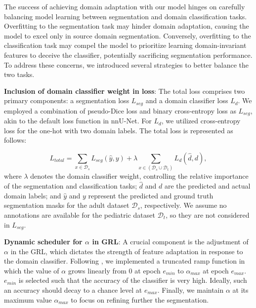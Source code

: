 \documentclass[runningheads]{llncs}
\begin{document}
The success of achieving domain adaptation with our model hinges on carefully balancing model learning between segmentation and domain classification tasks. Overfitting to the segmentation task may hinder domain adaptation, causing the model to excel only in source domain segmentation. Conversely, overfitting to the classification task may compel the model to prioritize learning domain-invariant features to deceive the classifier, potentially sacrificing segmentation performance. To address these concerns, we introduced several strategies to better balance the two tasks.

\textbf{Inclusion of domain classifier weight in loss}: The total loss comprises two primary components: a segmentation loss $L_{seg}$ and a domain classifier loss $L_d$. We employed a combination of pseudo-Dice loss and binary cross-entropy loss as $L_{seg}$, akin to the default loss function in nnU-Net. For $L_d$, we utilized cross-entropy loss for the one-hot with two domain labels. The total loss is represented as follows:

\begin{equation}
    L_{total} = \sum_{x\in \mathcal{D}_s} L_{seg}(\hat{y}, y) + \lambda \sum_{x\in (\mathcal{D}_s \cup \mathcal{D}_t)} L_{d}(\hat{d}, d),
\end{equation}
where $\lambda$ denotes the domain classifier weight, controlling the relative importance of the segmentation and classification tasks; $\hat{d}$ and $d$ are the predicted and actual domain labels; and $\hat{y}$ and $y$ represent the predicted and ground truth segmentation masks for the adult dataset $\mathcal{D}_s$, respectively. We assume no annotations are available for the pediatric dataset $\mathcal{D}_t$, so they are not considered in $L_{seg}$. 

\textbf{Dynamic scheduler for $\alpha$ in GRL}: A crucial component is the adjustment of $\alpha$ in the GRL, which dictates the strength of feature adaptation in response to the domain classifier. Following \cite{kamnitsas2017unsupervised}, we implemented a truncated ramp function in which the value of $\alpha$ grows linearly from 0 at epoch $e_{min}$ to $\alpha_{max}$ at epoch $e_{max}$. $e_{min}$ is selected such that the accuracy of the classifier is very high. Ideally, such an accuracy should decay to a chance level at $e_{max}$. Finally, we maintain $\alpha$ at its maximum value $\alpha_{max}$ to focus on refining further the segmentation. 
\end{document}
